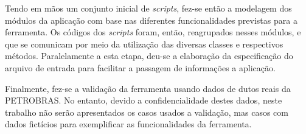 Tendo em mãos um conjunto inicial de \textit{scripts}, fez-se então a modelagem dos módulos da aplicação com base nas diferentes funcionalidades previstas para a ferramenta.
Os códigos dos \textit{scripts} foram, então, reagrupados nesses módulos, e que se comunicam por meio da utilização das diversas classes e respectivos métodos.
Paralelamente a esta etapa, deu-se a elaboração da especificação do arquivo de entrada para facilitar a passagem de informações a aplicação. 

Finalmente, fez-se a validação da ferramenta usando dados de dutos reais da PETROBRAS.
No entanto, devido a confidencialidade destes dados, neste trabalho não serão apresentados os casos usados a validação, mas casos com dados fictícios para exemplificar as funcionalidades da ferramenta.